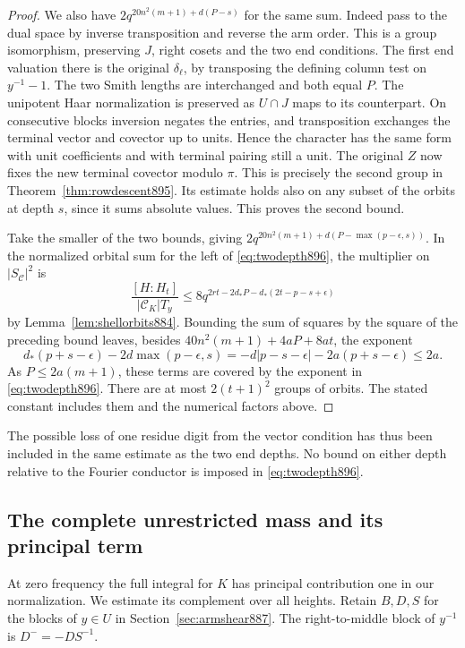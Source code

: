 \documentclass[a4paper,11pt]{article}
\theoremstyle{definition}
\theoremstyle{remark}
\numberwithin{equation}{section}
\begin{document}
\begin{proof}
We also have \(2q^{20n^2(m+1)+d(P-s)}\) for the same sum.
Indeed pass to the dual space by inverse transposition and
reverse the arm order. This is a group isomorphism, preserving
\(J\), right cosets and the two end conditions. The first end
valuation there is the original \(\delta_\ell\), by transposing
the defining column test on \(y^{-1}-1\). The two Smith lengths
are interchanged and both equal \(P\). The unipotent Haar
normalization is preserved as \(U\cap J\) maps to its counterpart.
On consecutive blocks inversion negates the entries, and
transposition exchanges the terminal vector and covector up to
units. Hence the character has the same form with unit
coefficients and with terminal pairing still a unit. The
original \(Z\) now fixes the new terminal covector modulo \(\pi\).
This is precisely the second group in
Theorem~\ref{thm:rowdescent895}. Its estimate holds also on any
subset of the orbits at depth \(s\), since it sums absolute
values. This proves the second bound.

Take the smaller of the two bounds, giving
\(2q^{20n^2(m+1)+d(P-\max(p-\epsilon,s))}\).
In the normalized orbital sum for the left of
\eqref{eq:twodepth896}, the multiplier on
\(|S_{\mathcal C}|^2\) is
\[
 \frac{[H:H_t]}{|\mathcal C_K|T_y}
 \le8q^{2rt-2d_*P-d_*(2t-p-s+\epsilon)}
\]
by Lemma~\ref{lem:shellorbits884}. Bounding the sum of squares
by the square of the preceding bound leaves, besides
\(40n^2(m+1)+4aP+8at\), the exponent
\[
 d_*(p+s-\epsilon)-2d\max(p-\epsilon,s)
  =-d|p-s-\epsilon|-2a(p+s-\epsilon)\le2a.
\]
As \(P\le2a(m+1)\), these terms are covered by the exponent
in \eqref{eq:twodepth896}. There are at most \(2(t+1)^2\)
groups of orbits. The stated constant includes them and the
numerical factors above.
\end{proof}

The possible loss of one residue digit from the vector condition
has thus been included in the same estimate as the two end
depths. No bound on either depth relative to the Fourier conductor
is imposed in \eqref{eq:twodepth896}.
\clearpage

\subsection{The complete unrestricted mass and its principal term}
\label{sec:allkmass897}

At zero frequency the full integral for \(K\) has principal
contribution one in our normalization. We estimate its complement
over all heights. Retain \(B,D,S\) for the blocks of \(y\in U\)
in Section~\ref{sec:armshear887}. The right-to-middle block of
\(y^{-1}\) is \(D^-=-D S^{-1}\).
\end{document}
